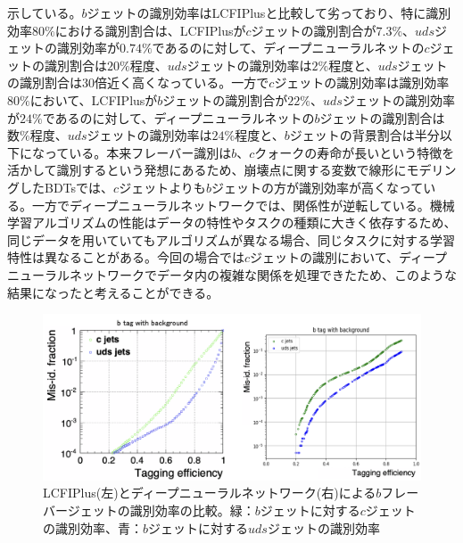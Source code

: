 示している。$b$ジェットの識別効率はLCFIPlusと比較して劣っており、特に識別効率$80\%$における識別割合は、LCFIPlusが$c$ジェットの識別割合が$7.3\%$、$uds$ジェットの識別効率が$0.74\%$であるのに対して、ディープニューラルネットの$c$ジェットの識別割合は$20\%程度$、$uds$ジェットの識別効率は$2\%程度$と、$uds$ジェットの識別割合は30倍近く高くなっている。一方で$c$ジェットの識別効率は識別効率$80\%$において、LCFIPlusが$b$ジェットの識別割合が$22\%$、$uds$ジェットの識別効率が$24\%$であるのに対して、ディープニューラルネットの$b$ジェットの識別割合は$数\%程度$、$uds$ジェットの識別効率は$24\%程度$と、$b$ジェットの背景割合は半分以下になっている。本来フレーバー識別は$b$、$c$クォークの寿命が長いという特徴を活かして識別するという発想にあるため、崩壊点に関する変数で線形にモデリングしたBDTsでは、$c$ジェットよりも$b$ジェットの方が識別効率が高くなっている。一方でディープニューラルネットワークでは、関係性が逆転している。機械学習アルゴリズムの性能はデータの特性やタスクの種類に大きく依存するため、同じデータを用いていてもアルゴリズムが異なる場合、同じタスクに対する学習特性は異なることがある。今回の場合では$c$ジェットの識別において、ディープニューラルネットワークでデータ内の複雑な関係を処理できたため、このような結果になったと考えることができる。
\begin{figure}[H]
	\begin{center}
 \includegraphics[keepaspectratio, scale=0.3]
 	{Figure/Flavortagging/dnneff_b.png}
 		\caption{LCFIPlus(左)とディープニューラルネットワーク(右)による$b$フレーバージェットの識別効率の比較。緑：$b$ジェットに対する$c$ジェットの識別効率、青：$b$ジェットに対する$uds$ジェットの識別効率}
 		\label{dnneff_b}
	\end{center}
\end{figure}

